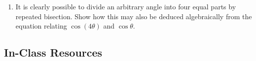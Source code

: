 \documentclass[11pt]{article}
\renewcommand\emph[1]{\underline{\bf{#1}}} %
\theoremstyle{definition}
\newenvironment{solution}{{\it Solution.} }{\hfill {\color{lightgray}$\blacksquare$}}
\begin{document}
\begin{enumerate}
  \item It is clearly possible to divide an arbitrary angle into four equal parts by repeated bisection.  Show how this may
  also be deduced algebraically from the equation relating $\cos(4\theta)$ and $\cos \theta$.
  \end{enumerate}

\newpage\subsection{In-Class Resources}
\end{document}
